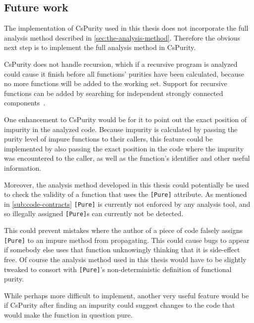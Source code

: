 \documentclass[a4paper,12pt]{article}
\begin{document}

\subsection{Future work} \label{sub:future-work}

The implementation of CsPurity used in this thesis does not incorporate the full analysis method described in \autoref{sec:the-analysis-method}. Therefore the obvious next step is to implement the full analysis method in CsPurity.

CsPurity does not handle recursion, which if a recursive program is analyzed could cause it finish before all functions' purities have been calculated, because no more functions will be added to the working set. Support for recursive functions can be added by searching for independent strongly connected components~\cite{pitidis2010purity}.

One enhancement to CsPurity would be for it to point out the exact position of impurity in the analyzed code. Because impurity is calculated by passing the purity level of impure functions to their callers, this feature could be implemented by also passing the exact position in the code where the impurity was encountered to the caller, as well as the function's identifier and other useful information. %

Moreover, the analysis method developed in this thesis could potentially be used to check the validity of a function that uses the \texttt{[Pure]} attribute. As mentioned in \autoref{sub:code-contracts} \texttt{[Pure]} is currently not enforced by any analysis tool, and so illegally assigned \texttt{[Pure]}s can currently not be detected.

This could prevent mistakes where the author of a piece of code falsely assigns \texttt{[Pure]} to an impure method from propagating. This could cause bugs to appear if somebody else uses that function unknowingly thinking that it is side-effect free. Of course the analysis method used in this thesis would have to be slightly tweaked to consort with \texttt{[Pure]}'s non-deterministic definition of functional purity.

While perhaps more difficult to implement, another very useful feature would be if CsPurity after finding an impurity could suggest changes to the code that would make the function in question pure.
\end{document}
